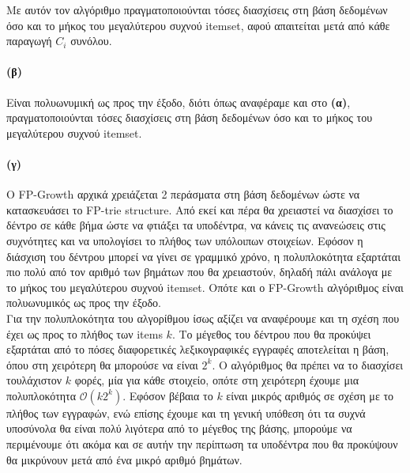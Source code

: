 \documentclass[a4paper,11pt]{article}
\begin{document}
Με αυτόν τον αλγόριθμο πραγματοποιούνται τόσες διασχίσεις στη βάση δεδομένων όσο και το μήκος του μεγαλύτερου συχνού itemset, αφού απαιτείται μετά από κάθε παραγωγή $C_i$ συνόλου.

\paragraph{(β)} Είναι πολυωνυμική ως προς την έξοδο, διότι όπως αναφέραμε και στο \textbf{(α)}, πραγματοποιούνται τόσες διασχίσεις στη βάση δεδομένων όσο και το μήκος του μεγαλύτερου συχνού itemset.

\paragraph{(γ)} Ο FP-Growth αρχικά χρειάζεται 2 περάσματα στη βάση δεδομένων ώστε να κατασκευάσει το FP-trie structure.
Από εκεί και πέρα θα χρειαστεί να διασχίσει το δέντρο σε κάθε βήμα ώστε να φτιάξει τα υποδέντρα, να κάνεις τις ανανεώσεις στις συχνότητες και να υπολογίσει το πλήθος των υπόλοιπων στοιχείων.
Εφόσον η διάσχιση του δέντρου μπορεί να γίνει σε γραμμικό χρόνο, η πολυπλοκότητα εξαρτάται πιο πολύ από τον αριθμό των βημάτων που θα χρειαστούν, δηλαδή πάλι ανάλογα με το μήκος του μεγαλύτερου συχνού itemset.
Οπότε και ο FP-Growth αλγόριθμος είναι πολυωνυμικός ως προς την έξοδο.
\\[8pt]
Για την πολυπλοκότητα του αλγορίθμου ίσως αξίζει να αναφέρουμε και τη σχέση που έχει ως προς το πλήθος των items $k$.
Tο μέγεθος του δέντρου που θα προκύψει εξαρτάται από το πόσες διαφορετικές λεξικογραφικές εγγραφές αποτελείται η βάση, όπου στη χειρότερη θα μπορούσε να είναι $2^k$.
Ο αλγόριθμος θα πρέπει να το διασχίσει τουλάχιστον $k$ φορές, μία για κάθε στοιχείο, οπότε στη χειρότερη έχουμε μια πολυπλοκότητα $\mathcal{O}(k2^k)$.
Εφόσον βέβαια το $k$ είναι μικρός αριθμός σε σχέση με το πλήθος των εγγραφών, ενώ επίσης έχουμε και τη γενική υπόθεση ότι τα συχνά υποσύνολα θα είναι πολύ λιγότερα από το μέγεθος της βάσης, μπορούμε να περιμένουμε ότι ακόμα και σε αυτήν την περίπτωση τα υποδέντρα που θα προκύψουν θα μικρύνουν μετά από ένα μικρό αριθμό βημάτων.
\end{document}
